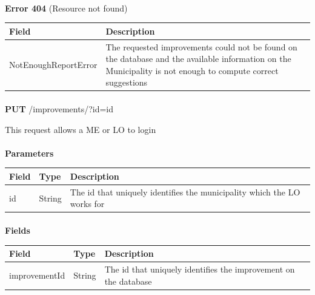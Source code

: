 						\paragraph{}
							\textbf{Error 404} (Resource not found)
							\begin{table}[!h]
								\begin{tabular}{L{0.4\textwidth}L{0.4\textwidth}}
									\toprule
									Field & Description \\
									\midrule
								  	NotEnoughReportError & The requested improvements could not be found on the database and the available information on the Municipality is not enough to compute correct suggestions \\
								 	\bottomrule
								\end{tabular}
							\end{table}
						
						\paragraph{}
						\textbf{PUT} /improvements/?id={id}
						
						This request allows a ME or LO to login
						\paragraph{}
							\textbf{Parameters}
							\begin{table}[!h]
								\begin{tabular}{L{0.2\textwidth}L{0.2\textwidth}L{0.4\textwidth}}
									\toprule
									Field & Type & Description \\
									\midrule
								 	id & String & The id that uniquely identifies the municipality which the LO works for \\
								 	\bottomrule
								\end{tabular}
							\end{table}
						\paragraph{}
							\textbf{Fields}
							\begin{table}[!h]
								\begin{tabular}{L{0.25\textwidth}L{0.15\textwidth}L{0.4\textwidth}}
									\toprule
									Field & Type & Description \\
									\midrule
								 	improvementId & String & The id that uniquely identifies the improvement on the database \\
								 	\bottomrule
								\end{tabular}
							\end{table}
